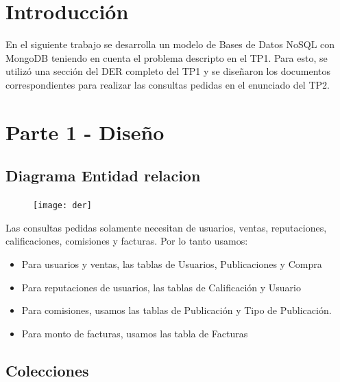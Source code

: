 \documentclass[a4paper, 10pt, twoside]{article}
\begin{document}
\newpage




\section{Introducción}

En el siguiente trabajo se desarrolla un modelo de Bases de Datos NoSQL con MongoDB teniendo en cuenta el problema descripto en el TP1.
Para esto, se utiliz\'o una secci\'on del DER completo del TP1 y se diseñaron los documentos correspondientes para realizar las consultas pedidas en el enunciado del TP2.

\section{Parte 1 - Diseño}

\subsection{Diagrama Entidad relacion}

\begin{figure}[h]
\texttt{[image: der]}
\end{figure}

Las consultas pedidas solamente necesitan de usuarios, ventas, reputaciones, calificaciones, comisiones y facturas. Por lo tanto usamos:

\begin{itemize}
\item Para usuarios y ventas, las tablas de Usuarios, Publicaciones y Compra
\item Para reputaciones de usuarios, las tablas de Calificaci\'on y Usuario
\item Para comisiones, usamos las tablas de Publicaci\'on y Tipo de Publicaci\'on.
\item Para monto de facturas, usamos las tabla de Facturas
\end{itemize}

\newpage
\subsection{Colecciones}
\end{document}

